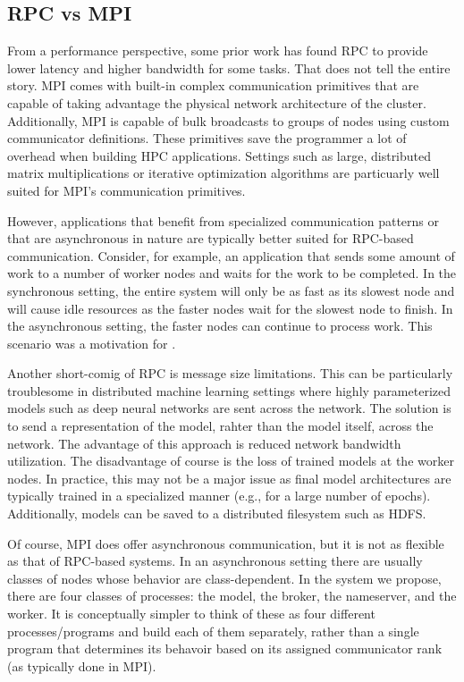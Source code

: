 \documentclass[conference]{IEEEtran}
\begin{document}
\subsection{RPC vs MPI}
From
a performance perspective, some prior work \cite{rpc-perf} has found RPC to provide lower
latency and higher bandwidth for some tasks. That does not tell the entire
story. MPI comes with built-in complex communication primitives that are capable
of taking advantage the physical network architecture of the
cluster. Additionally, MPI is capable of bulk broadcasts to groups of nodes
using custom communicator definitions. These primitives save the programmer a
lot of overhead when building HPC applications. Settings such as large,
distributed matrix multiplications or iterative optimization algorithms are
particuarly well suited for MPI's communication primitives.

However, applications that benefit from specialized communication patterns or
that are asynchronous in nature are typically better suited for RPC-based
communication. Consider, for example, an application that sends some amount of
work to a number of worker nodes and waits for the work to be completed. In the
synchronous setting, the entire system will only be as fast as its slowest node
and will cause idle resources as the faster nodes wait for the slowest node to
finish. In the asynchronous setting, the faster nodes can continue to process
work. This scenario was a motivation for \cite{40565}.

Another short-comig of RPC is message size limitations. This can be particularly
troublesome in distributed machine learning settings where highly parameterized
models such as deep neural networks are sent across the network. The solution
is to send a representation of the model, rahter than the model itself, across
the network. The advantage of this approach is reduced network bandwidth
utilization. The disadvantage of course is the loss of trained models at the
worker nodes. In practice, this may not be a major issue as final model
architectures are typically trained in a specialized manner (e.g., for a large
number of epochs). Additionally, models can be saved to a distributed filesystem
such as HDFS.

Of course,
MPI does offer asynchronous communication, but it is not as flexible as that of
RPC-based systems. In an asynchronous setting there are usually classes of nodes
whose behavior are class-dependent. In the system we propose, there are four
classes of processes: the model, the broker, the nameserver, and the worker. It
is conceptually simpler to think of these as four different processes/programs
and build each of them separately, rather than a single program that determines
its behavoir based on its assigned communicator rank (as typically done in MPI).
\end{document}
